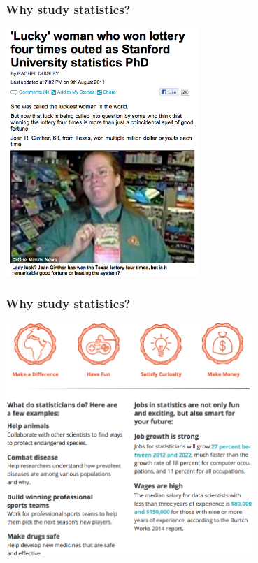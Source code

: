 \documentclass[11pt,containsverbatim,handout,xcolor=xelatex,dvipsnames,table]{beamer}
\begin{document}
\begin{frame}
\frametitle{Why study statistics?}

\begin{center}
\includegraphics[width=0.55\textwidth]{figures/lottery}
\end{center}

\end{frame}


\begin{frame}
\frametitle{Why study statistics?}

\begin{center}
\includegraphics[width=0.7\textwidth]{figures/why_stats}
\end{center}

\vspace{-0.25cm}


\end{frame}
\end{document}
